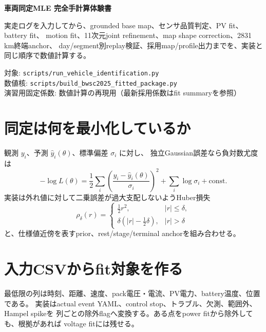 
\begin{titlepage}
\centering
{\Huge\bfseries 車両同定MLE 完全手計算体験書\par}
\vspace{7mm}
{\Large \editionlabel\par}
\vspace{10mm}
\begin{tcolorbox}[colback=white,colframe=black,width=0.92\textwidth]
実走ログを入力してから、grounded base map、センサ品質判定、PV fit、battery fit、
motion fit、11次元joint refinement、map shape correction、2831 km終端anchor、
day/segment別replay検証、採用map/profile出力までを、実装と同じ順序で数値計算する。
\end{tcolorbox}
\vfill
対象: \texttt{scripts/run\_vehicle\_identification.py}\\
数値核: \texttt{scripts/build\_bwsc2025\_fitted\_package.py}\\
演習用固定係数: 数値計算の再現用（最新採用係数はfit summaryを参照）
\end{titlepage}
\tableofcontents
\newpage

\section{同定は何を最小化しているか}
観測 $y_i$、予測 $\hat y_i(\theta)$、標準偏差 $\sigma_i$ に対し、
独立Gaussian誤差なら負対数尤度は
\[
-\log L(\theta)=\frac12\sum_i
\left(\frac{y_i-\hat y_i(\theta)}{\sigma_i}\right)^2
+\sum_i\log\sigma_i+\mathrm{const}.
\]
実装は外れ値に対して二乗誤差が過大支配しないようHuber損失
\[
\rho_\delta(r)=
\begin{cases}\tfrac12r^2,&|r|\le\delta,\\
\delta(|r|-\tfrac12\delta),&|r|>\delta
\end{cases}
\]
と、仕様値近傍を表すprior、rest/stage/terminal anchorを組み合わせる。



\section{入力CSVからfit対象を作る}
最低限の列は時刻、距離、速度、pack電圧・電流、PV電力、battery温度、位置である。
実装はactual event YAML、control stop、トラブル、欠測、範囲外、Hampel spikeを
列ごとの除外flagへ変換する。ある点をpower fitから除外しても、根拠があれば
voltage fitには残せる。

